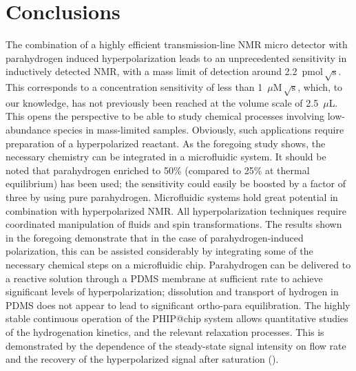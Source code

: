 \section{Conclusions}

The combination of a highly efficient transmission-line NMR micro detector with
parahydrogen induced hyperpolarization leads to an unprecedented sensitivity
in inductively detected NMR, with a mass limit of detection around
2.2~$\text{pmol}\,\sqrt{\mathrm{s}}$. This corresponds to a concentration
sensitivity of less than 1~$\mu \mathrm{M}\,\sqrt{\text{s}}$,
which, to our knowledge, has not previously been reached at the volume
scale of 2.5~$\mu$L.
This opens the perspective to be able to study chemical processes involving
low-abundance species in mass-limited samples. Obviously, such applications
require preparation of a hyperpolarized reactant. As the foregoing study shows,
the necessary chemistry can be integrated in a microfluidic system.
It should be noted that
parahydrogen enriched to 50\% (compared to 25\%
at thermal equilibrium) has been used; the sensitivity
could easily be boosted by a factor of three by using pure parahydrogen.
Microfluidic systems hold great potential in combination
with hyperpolarized NMR. All hyperpolarization techniques require coordinated
manipulation of fluids and spin transformations. The results shown in the
foregoing demonstrate that in the case of parahydrogen-induced polarization,
this can be assisted considerably by integrating some of the necessary chemical
steps on a microfluidic chip. Parahydrogen can be delivered to a reactive
solution through a PDMS membrane at sufficient rate to achieve significant
levels of hyperpolarization; dissolution and transport of hydrogen in PDMS does
not appear to lead to significant ortho-para equilibration.
The highly stable continuous operation
of the PHIP@chip system allows quantitative studies
of the hydrogenation kinetics, and the relevant relaxation processes.
This is demonstrated by the dependence of the steady-state signal intensity on
flow rate and the recovery of the
hyperpolarized signal after saturation ().

